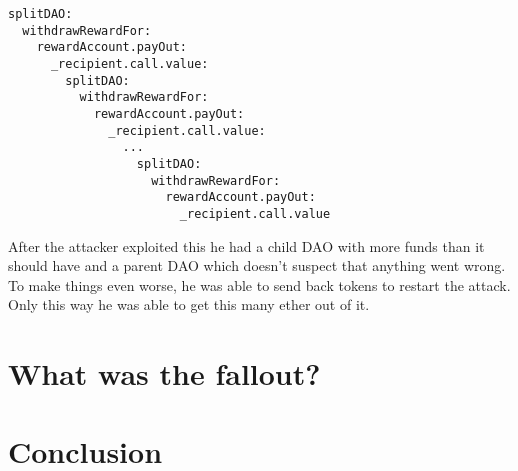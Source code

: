 \documentclass[a4paper, 11pt]{scrartcl}
\begin{document}
\begin{verbatim}
splitDAO:
  withdrawRewardFor:
    rewardAccount.payOut:
      _recipient.call.value:
        splitDAO:
          withdrawRewardFor:
            rewardAccount.payOut:
              _recipient.call.value:
                ...  
                  splitDAO:
                    withdrawRewardFor:
                      rewardAccount.payOut:
                        _recipient.call.value
\end{verbatim}

After the attacker exploited this he had a child DAO with more funds than it should have and a parent DAO which doesn't suspect that anything went wrong. To make things even worse, he was able to send back tokens to restart the attack. Only this way he was able to get this many ether out of it. \cite{deconstructingDaoAttack}

\section{What was the fallout?}



\section{Conclusion}

\nocite{*}
\clearpage
\printbibliography[heading=bibintoc]
\end{document}
